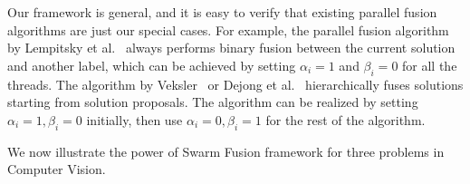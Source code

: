  Our framework is
general, and it is easy to verify that existing parallel fusion
algorithms are just our special cases.
%
For example, the parallel fusion algorithm by Lempitsky et
al.~\cite{viktor} always performs binary fusion between the current
solution and another label, which can be achieved by setting $\alpha_i =
1$ and $\beta_i = 0$ for all the threads. The algorithm by
Veksler~\cite{olga} or Dejong et al.~\cite{dejong} hierarchically fuses
solutions starting from solution proposals. The algorithm can be
realized by setting $\alpha_i = 1, \beta_i = 0$ initially, then use
$\alpha_i = 0, \beta_i=1$  for the rest of the algorithm.

\noindent
We now illustrate the power of Swarm Fusion framework for three problems
in Computer Vision. 






